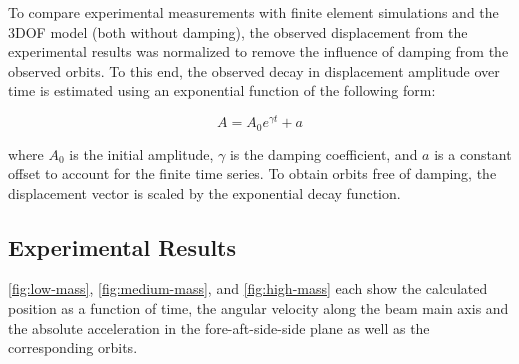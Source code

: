 \documentclass{article}
\begin{document}
To compare experimental measurements with finite element simulations and the 3DOF model (both without damping), the observed displacement from the experimental results was normalized to remove the influence of damping from the observed orbits. To this end, the observed decay in displacement amplitude over time is estimated using an exponential function of the following form:

\begin{equation}
    A = A_0 e ^ {\gamma t} + a
\end{equation}

where $A_0$ is the initial amplitude, $\gamma$ is the damping coefficient, and $a$ is a constant offset to account for the finite time series. To obtain orbits free of damping, the displacement vector is scaled by the exponential decay function. 

\subsection{Experimental Results}

\autoref{fig:low-mass}, \autoref{fig:medium-mass}, and \autoref{fig:high-mass} each show the calculated position as a function of time, the angular velocity along the beam main axis and the absolute acceleration in the fore-aft-side-side plane as well as the corresponding orbits. 

\end{document}
